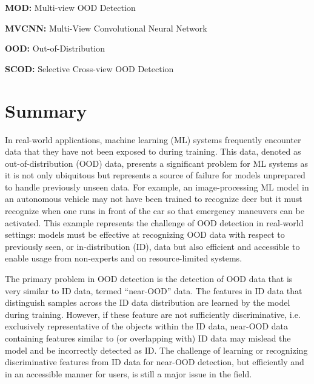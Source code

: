 \documentclass[12pt,reqno,oneside]{amsbook}
\theoremstyle{definition}
\newcommand{\?}{\stackrel{?}{=}}
\begin{document}
\textbf{MOD:} Multi-view OOD Detection

\textbf{MVCNN:} Multi-View Convolutional Neural Network

\textbf{OOD:} Out-of-Distribution

\textbf{SCOD:} Selective Cross-view OOD Detection

\chapter*{Summary}

In real-world applications, machine learning (ML) systems frequently encounter data that they have not been exposed to during training. This data, denoted as out-of-distribution (OOD) data, presents a significant problem for ML systems as it is not only ubiquitous but represents a source of failure for models unprepared to handle previously unseen data. For example, an image-processing ML model in an autonomous vehicle may not have been trained to recognize deer but it must recognize when one runs in front of the car so that emergency maneuvers can be activated. This example represents the challenge of OOD detection in real-world settings: models must be effective at recognizing OOD data with respect to previously seen, or in-distribution (ID), data but also efficient and accessible to enable usage from non-experts and on resource-limited systems.

The primary problem in OOD detection is the detection of OOD data that is very similar to ID data, termed ``near-OOD'' data. The features in ID data that distinguish samples across the ID data distribution are learned by the model during training. However, if these feature are not sufficiently discriminative, i.e. exclusively representative of the objects within the ID data, near-OOD data containing features similar to (or overlapping with) ID data may mislead the model and be incorrectly detected as ID. The challenge of learning or recognizing discriminative features from ID data for near-OOD detection, but efficiently and in an accessible manner for users, is still a major issue in the field.
\end{document}
